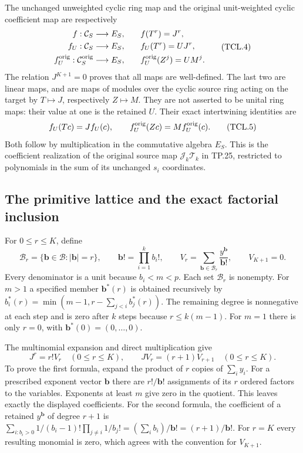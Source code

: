 The unchanged unweighted cyclic ring map and the original unit-weighted
cyclic coefficient map are respectively
\[
 \begin{split}
 f:\mathcal C_S\longrightarrow E_S,&\qquad f(T^r)=J^r,\\
 f_U:\mathcal C_S\longrightarrow E_S,&\qquad f_U(T^r)=U J^r,\\
 f_U^{\rm orig}:\mathcal C_S^{\rm orig}\longrightarrow E_S,
 &\qquad f_U^{\rm orig}(Z^j)=U M^j.
 \end{split}
 \tag{TCL.4}\label{CFStage:eq:tcl-original-map}
\]
The relation \(J^{K+1}=0\) proves that all maps are well-defined.
The last two are linear maps, and are maps of modules over the cyclic
source ring acting on the target by \(T\mapsto J\), respectively
\(Z\mapsto M\). They are not asserted to be unital ring maps:
their value at one is the retained \(U\). Their exact intertwining
identities are
\[
 f_U(Tc)=Jf_U(c),\qquad
 f_U^{\rm orig}(Zc)=M f_U^{\rm orig}(c).
 \tag{TCL.5}\label{CFStage:eq:tcl-intertwining}
\]
Both follow by multiplication in the commutative algebra \(E_S\).
This is the coefficient realization of the original source map
\(\mathcal J_k\mathcal T_k\) in TP.25, restricted to polynomials
in the sum of its unchanged \(s_i\) coordinates.

\subsection{The primitive lattice and the exact factorial inclusion}

For \(0\leq r\leq K\), define
\[
 \mathcal B_r=\{\mathbf b\in\mathcal B:|\mathbf b|=r\},\qquad
 \mathbf b!=\prod_{i=1}^k b_i!,\qquad
 V_r=\sum_{\mathbf b\in\mathcal B_r}\frac{y^{\mathbf b}}{\mathbf b!},
 \qquad V_{K+1}=0.
 \tag{TCL.6}\label{CFStage:eq:tcl-divided}
\]
Every denominator is a unit because \(b_i<m<p\). Each set
\(\mathcal B_r\) is nonempty. For \(m>1\) a specified member
\(\mathbf b^*(r)\) is obtained recursively by
\(b_i^*(r)=\min(m-1,r-\sum_{j<i}b_j^*(r))\).
The remaining degree is nonnegative at each step and is zero after
\(k\) steps because \(r\leq k(m-1)\). For \(m=1\) there is only
\(r=0\), with \(\mathbf b^*(0)=(0,\ldots,0)\).

The multinomial expansion and direct multiplication give
\[
 J^r=r!V_r\quad(0\leq r\leq K),\qquad
 J V_r=(r+1)V_{r+1}\quad(0\leq r\leq K).
 \tag{TCL.7}\label{CFStage:eq:tcl-factorial}
\]
To prove the first formula, expand the product of \(r\) copies
of \(\sum_i y_i\). For a prescribed exponent vector \(\mathbf b\)
there are \(r!/\mathbf b!\) assignments of its \(r\) ordered
factors to the variables. Exponents at least \(m\) give zero in
the quotient. This leaves exactly the displayed coefficients.
For the second formula, the coefficient of a retained
\(y^{\mathbf b}\) of degree \(r+1\) is
\(\sum_{i:b_i>0}1/(b_i-1)!\prod_{j\ne i}1/b_j!
=(\sum_i b_i)/\mathbf b!=(r+1)/\mathbf b!\).
For \(r=K\) every resulting monomial is zero, which agrees with
the convention for \(V_{K+1}\).

